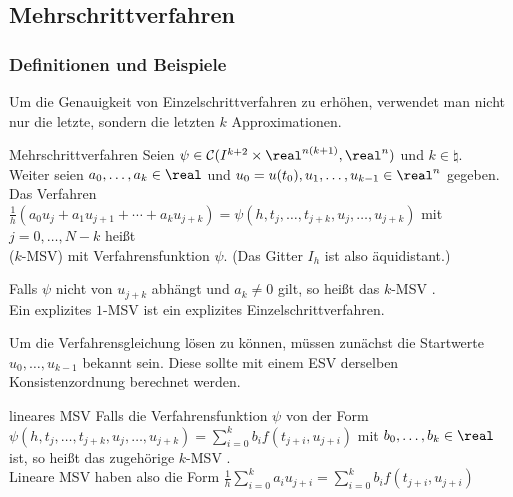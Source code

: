 \pagebreak

\subsection{%
    Mehrschrittverfahren%
}

\subsubsection{%
    Definitionen und Beispiele%
}

\begin{Bem}
    Um die Genauigkeit von Einzelschrittverfahren zu erhöhen, verwendet man
    nicht nur die letzte, sondern die letzten $k$ Approximationen.
\end{Bem}

\begin{Def}{Mehrschrittverfahren}
    Seien $\psi \in \C(I^{k+2} \times \real^{n(k+1)}, \real^n)$ und
    $k \in \natural$.\\
    Weiter seien $a_0, \dotsc, a_k \in \real$
    und $u_0 = u(t_0), u_1, \dotsc, u_{k-1} \in \real^n$ gegeben.
    Das Verfahren\\
    $\frac{1}{h} (a_0 u_j + a_1 u_{j+1} + \dotsb + a_k u_{j+k}) =
    \psi(h, t_j, \dotsc, t_{j+k}, u_j, \dotsc, u_{j+k})$ mit
    $j = 0, \dotsc, N - k$ heißt\\
     ($k$-MSV) mit Verfahrensfunktion $\psi$.
    (Das Gitter $I_h$ ist also äquidistant.)
\end{Def}

\begin{Bem}
    Falls $\psi$ nicht von $u_{j+k}$ abhängt und $a_k \not= 0$ gilt, so heißt
    das $k$-MSV .\\
    Ein explizites $1$-MSV ist ein explizites Einzelschrittverfahren.
\end{Bem}

\begin{Bem}
    Um die Verfahrensgleichung lösen zu können, müssen zunächst die Startwerte
    $u_0, \dotsc, u_{k-1}$ bekannt sein.
    Diese sollte mit einem ESV derselben Konsistenzordnung berechnet werden.
\end{Bem}

\begin{Def}{lineares MSV}
    Falls die Verfahrensfunktion $\psi$ von der Form
    $\psi(h, t_j, \dotsc, t_{j+k}, u_j, \dotsc, u_{j+k}) =
    \sum_{i=0}^k b_i f(t_{j+i}, u_{j+i})$ mit $b_0, \dotsc, b_k \in \real$ ist,
    so heißt das zugehörige $k$-MSV .\\
    Lineare MSV haben also die Form
    $\frac{1}{h} \sum_{i=0}^k a_i u_{j+i} =
    \sum_{i=0}^k b_i f(t_{j+i}, u_{j+i})$
\end{Def}

